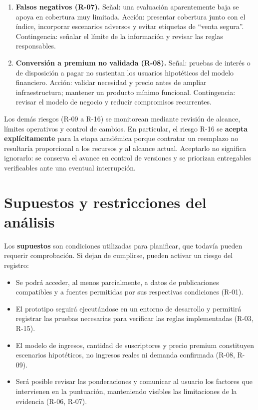 \begin{enumerate}
    \item \textbf{Falsos negativos (R-07).} Señal: una evaluación aparentemente baja se apoya en cobertura muy limitada. Acción: presentar cobertura junto con el índice, incorporar escenarios adversos y evitar etiquetas de ``venta segura''. Contingencia: señalar el límite de la información y revisar las reglas responsables.

    \item \textbf{Conversión a premium no validada (R-08).} Señal: pruebas de interés o de disposición a pagar no sustentan los usuarios hipotéticos del modelo financiero. Acción: validar necesidad y precio antes de ampliar infraestructura; mantener un producto mínimo funcional. Contingencia: revisar el modelo de negocio y reducir compromisos recurrentes.
\end{enumerate}

Los demás riesgos (R-09 a R-16) se monitorean mediante revisión de alcance, límites operativos y control de cambios. En particular, el riesgo R-16 se \textbf{acepta explícitamente} para la etapa académica porque contratar un reemplazo no resultaría proporcional a los recursos y al alcance actual. Aceptarlo no significa ignorarlo: se conserva el avance en control de versiones y se priorizan entregables verificables ante una eventual interrupción.

\section{Supuestos y restricciones del análisis}\label{sec:ml-riesgos-supuestos}

Los \textbf{supuestos} son condiciones utilizadas para planificar, que todavía pueden requerir comprobación. Si dejan de cumplirse, pueden activar un riesgo del registro:
\begin{itemize}
    \item Se podrá acceder, al menos parcialmente, a datos de publicaciones compatibles y a fuentes permitidas por sus respectivas condiciones (R-01).
    \item El prototipo seguirá ejecutándose en un entorno de desarrollo y permitirá registrar las pruebas necesarias para verificar las reglas implementadas (R-03, R-15).
    \item El modelo de ingresos, cantidad de suscriptores y precio premium constituyen escenarios hipotéticos, no ingresos reales ni demanda confirmada (R-08, R-09).
    \item Será posible revisar las ponderaciones y comunicar al usuario los factores que intervienen en la puntuación, manteniendo visibles las limitaciones de la evidencia (R-06, R-07).
\end{itemize}

